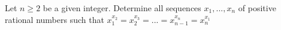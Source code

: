 Let $n\ge  2$ be a given integer. Determine all sequences $x_1,...,x_n$ of positive rational numbers such that
$x_1^{x_2}=x_2^{x_3}=...=x_{n-1}^{x_n}=x_n^{x_1}$
